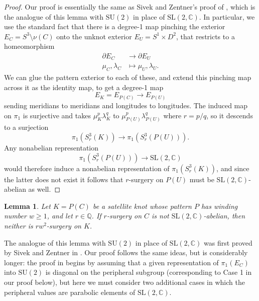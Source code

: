 \documentclass[11pt]{amsart}
\newtheorem {lemma}[theorem]{Lemma}
\numberwithin{equation}{section}
\numberwithin{theorem}{section}
\theoremstyle{definition}
\newcommand{\C}{\mathbb{C}}
\newcommand{\Q}{\mathbb{Q}}
\newcommand\SU{\mathrm{SU}}
\newcommand\SL{\mathrm{SL}}
\begin{document}
\begin{proof}
Our proof is essentially the same as Sivek and Zentner's proof of \cite[Proposition~10.2]{sz-pillowcase}, which is the analogue of this lemma with $\SU(2)$ in place of $\SL(2,\C)$.  In particular, we use the standard fact that there is a degree-1 map pinching the exterior $E_C = S^3 \setminus \nu(C)$ onto the unknot exterior $E_U = S^1\times D^2$, that restricts to a homeomorphism
\begin{align*}
\partial E_C &\to \partial E_U \\
\mu_C,\lambda_C &\mapsto \mu_U,\lambda_U.
\end{align*}
We can glue the pattern exterior to each of these, and extend this pinching map across it as the identity map, to get a degree-1 map
\[ E_K = E_{P(C)} \to E_{P(U)} \]
sending meridians to meridians and longitudes to longitudes.  The induced map on $\pi_1$ is surjective and takes $\mu_K^p \lambda_K^q$ to $\mu_{P(U)}^p \lambda_{P(U)}^q$ where $r=p/q$, so it descends to a surjection
\[ \pi_1(S^3_r(K)) \to \pi_1(S^3_r(P(U))). \]
Any nonabelian representation
\[ \pi_1(S^3_r(P(U))) \to \SL(2,\C) \]
would therefore induce a  nonabelian representation of $\pi_1(S^3_r(K))$, and since the latter does not exist it follows that $r$-surgery on $P(U)$ must be $\SL(2,\C)$-abelian as well.
\end{proof}

\begin{lemma} \label{lem:sl2-abelian-companion}
Let $K = P(C)$ be a satellite knot whose pattern $P$ has winding number $w \geq 1$, and let $r\in\Q$.  If $r$-surgery on $C$ is not $\SL(2,\C)$-abelian, then neither is $rw^2$-surgery on $K$.
\end{lemma}

The analogue of this lemma with $\SU(2)$ in place of $\SL(2,\C)$ was first proved by Sivek and Zentner in \cite[Proposition~10.3]{sz-pillowcase}. Our proof follows the same ideas, but is considerably longer: the  proof in \cite{sz-pillowcase} begins by assuming that a given representation of $\pi_1(E_C)$ into $\SU(2)$ is diagonal on the peripheral subgroup (corresponding to Case 1 in our proof below), but here we must consider two additional cases in which the peripheral values are parabolic elements of $\SL(2,\C)$.
\end{document}
